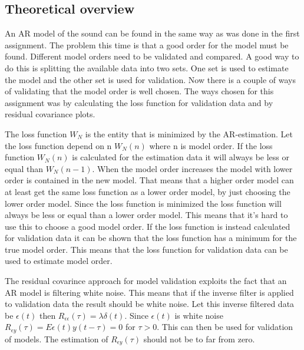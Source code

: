 \documentclass[12pt]{article}
\begin{document}
\subsection{Theoretical overview}
An AR model of the sound can be found in the same way as was done in the first assignment.
The problem this time is that a good order for the model must be found.
Different model orders need to be validated and compared.
A good way to do this is splitting the available data into two sets. One set is used to estimate the model and the other set is used for validation.
Now there is a couple of ways of validating that the model order is well chosen.
The ways chosen for this assignment was by calculating the loss function for validation data and by residual covariance plots.

The loss function $W_N$ is the entity that is minimized by the AR-estimation.
Let the loss function depend on n $W_N(n)$ where n is model order.
If the loss function $W_N(n)$ is calculated for the estimation data it will always be less or equal than $W_N(n-1)$.
When the model order increases the model with lower order is contained in the new model.
That means that a higher order model can at least get the same loss function as a lower order model, by just choosing the lower order model.
Since the loss function is minimized the loss function will always be less or equal than a lower order model.
This means that it's hard to use this to choose a good model order.
If the loss function is instead calculated for validation data it can be shown that the loss function has a minimum for the true model order.
This means that the loss function for validation data can be used to estimate model order.

The residual covarince approach for model validation exploits the fact that an AR model is filtering white noise.
This means that if the inverse filter is applied to validation data the result should be white noise.
Let this inverse filtered data be $\epsilon(t)$ then $R_{\epsilon \epsilon}(\tau) = \lambda\delta(t)$.
Since $\epsilon(t)$ is white noise $R_{\epsilon y}(\tau) = E\epsilon(t) y(t-\tau) = 0$ for $\tau > 0$.
This can then be used for validation of models.
The estimation of $R_{\epsilon y}(\tau)$ should not be to far from zero.
\end{document}

